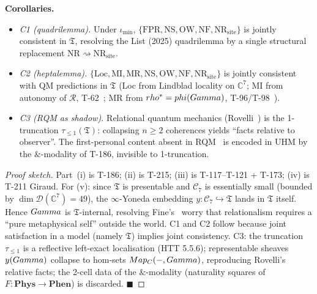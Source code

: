 \begin{theorembox}
\noindent
\textbf{Corollaries.}
\begin{itemize}[leftmargin=2em,nosep]
  \item \emph{C1 (quadrilemma).} Under $\iota_{\min}$, $\{\mathrm{FPR},
        \mathrm{NS}, \mathrm{OW}, \mathrm{NF}, \mathrm{NR}_{\mathrm{site}}\}$
        is jointly consistent in $\mathfrak T$, resolving the List
        (2025) quadrilemma by a single structural replacement
        $\mathrm{NR} \rightsquigarrow \mathrm{NR}_{\mathrm{site}}$.
  \item \emph{C2 (heptalemma).} $\{\mathrm{Loc}, \mathrm{MI},
        \mathrm{MR}, \mathrm{NS}, \mathrm{OW}, \mathrm{NF},
        \mathrm{NR}_{\mathrm{site}}\}$ is jointly consistent with
        QM predictions in $\mathfrak T$ (Loc from Lindblad locality on
        $\mathbb C^7$; MI from autonomy of $\mathcal R$, T-62~;
        MR from $rho^* = phi(Gamma)$, T-96/T-98~).
  \item \emph{C3 (RQM as shadow).} Relational quantum mechanics
        (Rovelli~\citep{rovelli1996rqm}) is the 1-truncation
        $\tau_{\leq 1}(\mathfrak T)$: collapsing $n \geq 2$ coherences
        yields ``facts relative to observer''. The first-personal content
        absent in RQM~\citep{glick2021qbism} is encoded in UHM by the
        $\&$-modality of T-186, invisible to 1-truncation.
\end{itemize}
\end{theorembox}

\begin{proof}[Proof sketch]
Part~(i) is T-186; (ii) is T-215; (iii) is T-117--T-121 + T-173; (iv) is
T-211 Giraud. For (v): since $\mathfrak T$ is presentable and
$\mathcal C_7$ is essentially small (bounded by $\dim \mathcal D(\mathbb C^7) =
49$), the $\infty$-Yoneda embedding $y : \mathcal C_7 \hookrightarrow
\mathfrak T$ lands in $\mathfrak T$ itself. Hence $Gamma$ is
$\mathfrak T$-internal, resolving Fine's~\citep{fine2005tense} worry
that relationalism requires a ``pure metaphysical self'' outside the
world. C1 and C2 follow because joint satisfaction in a model
(namely $\mathfrak T$) implies joint consistency. C3: the truncation
$\tau_{\leq 1}$ is a reflective left-exact localisation (HTT 5.5.6);
representable sheaves $y(Gamma)$ collapse to hom-sets
$Map_{C}(-,Gamma)$, reproducing Rovelli's relative
facts; the 2-cell data of the $\&$-modality (naturality squares of
$F : \mathbf{Phys} \to \mathbf{Phen}$) is discarded. $\blacksquare$
\end{proof}

